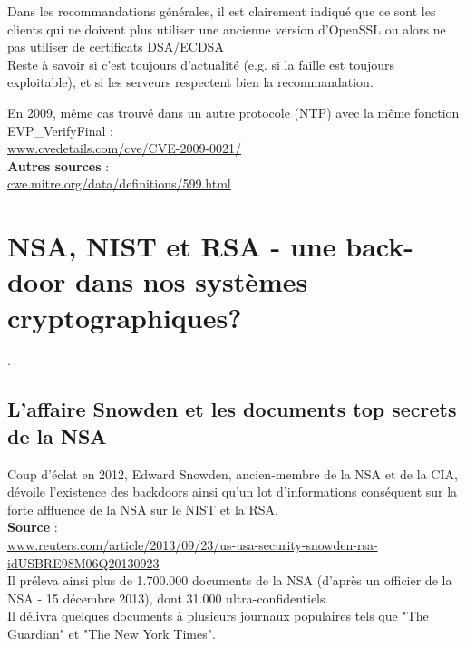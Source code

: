 \documentclass{article}
\begin{document}
	Dans les recommandations générales, il est clairement indiqué que ce sont 
	les clients qui ne doivent plus utiliser une ancienne version d'OpenSSL ou 
	alors ne pas utiliser de certificats DSA/ECDSA\\

	Reste à savoir si c'est toujours d'actualité (e.g. si la faille est toujours
	exploitable), et si les serveurs respectent bien la recommandation.

	En 2009, même cas trouvé dans un autre protocole (NTP) avec la même 
	fonction EVP\_VerifyFinal :\\
	\href{http://www.cvedetails.com/cve/CVE-2009-0021/}
	{www.cvedetails.com/cve/CVE-2009-0021/}\\

	\textbf{Autres sources} :\\
	\href{http://cwe.mitre.org/data/definitions/599.html}
	{cwe.mitre.org/data/definitions/599.html}

	\newpage
	
	
	
	
	
	
	
	
\section{NSA, NIST et RSA - une back-door dans nos systèmes cryptographiques?}.

	\subsection{L'affaire Snowden et les documents top secrets de la NSA}
	
	Coup d'éclat en 2012, Edward Snowden, ancien-membre de la NSA et de
	la CIA,	dévoile l'existence des backdoors ainsi qu'un lot
	d'informations conséquent sur la forte affluence de la NSA
	sur le NIST et la RSA.\\

	\textbf{Source} : \\
	\href{http://www.reuters.com/article/2013/09/23/us-usa-security-snowden-rsa-idUSBRE98M06Q20130923}
	{www.reuters.com/article/2013/09/23/us-usa-security-snowden-rsa-idUSBRE98M06Q20130923}\\
	
	Il préleva ainsi plus de 1.700.000 documents de la NSA (d'après un 
	officier de la NSA - 15 décembre 2013), dont 31.000 
	ultra-confidentiels.\\
	
	Il délivra quelques documents à plusieurs journaux populaires
	tels que "The Guardian" et "The New York Times".\\
	
\end{document}

